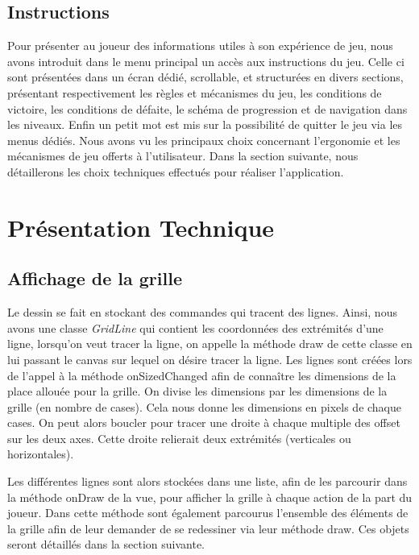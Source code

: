 \documentclass[12pt, a4paper]{article}%
\begin{document}
	\subsection{Instructions}
	Pour présenter au joueur des informations utiles à son expérience de jeu, nous avons introduit dans le menu principal un accès aux instructions du jeu. Celle ci sont présentées dans un écran dédié, scrollable, et structurées en divers sections, présentant respectivement les règles et mécanismes du jeu, les conditions de victoire, les conditions de défaite, le schéma de progression et de navigation dans les niveaux. Enfin un petit mot est mis sur la possibilité de quitter le jeu via les menus dédiés.
	\newline
	Nous avons vu les principaux choix concernant l'ergonomie et les mécanismes de jeu offerts à l'utilisateur. Dans la section suivante, nous détaillerons les choix techniques effectués pour réaliser l'application.
		 
\section{Présentation Technique}
    \subsection{Affichage de la grille}
    Le dessin se fait en stockant des commandes qui tracent des lignes. Ainsi, nous avons une classe \textit{GridLine} qui
    contient les coordonnées des extrémités d'une ligne, lorsqu'on veut tracer la ligne, on appelle la méthode draw de cette
    classe en lui passant le canvas sur lequel on désire tracer la ligne. Les lignes sont créées lors de l'appel à la méthode
    onSizedChanged afin de connaître les dimensions de la place allouée pour la grille. On divise les dimensions par les
    dimensions de la grille (en nombre de cases). Cela nous donne les dimensions en pixels de chaque cases. On peut alors boucler
    pour tracer une droite à chaque multiple des offset sur les deux axes. Cette droite relierait deux extrémités (verticales ou
    horizontales).
    \newline

    Les différentes lignes sont alors stockées dans une liste, afin de les parcourir dans la méthode onDraw de la vue, pour
    afficher la grille à chaque action de la part du joueur. Dans cette méthode sont également parcourus l'ensemble des éléments
    de la grille afin de leur demander de se redessiner via leur méthode draw. Ces objets seront détaillés dans la section
    suivante.
    \newline
\end{document}

